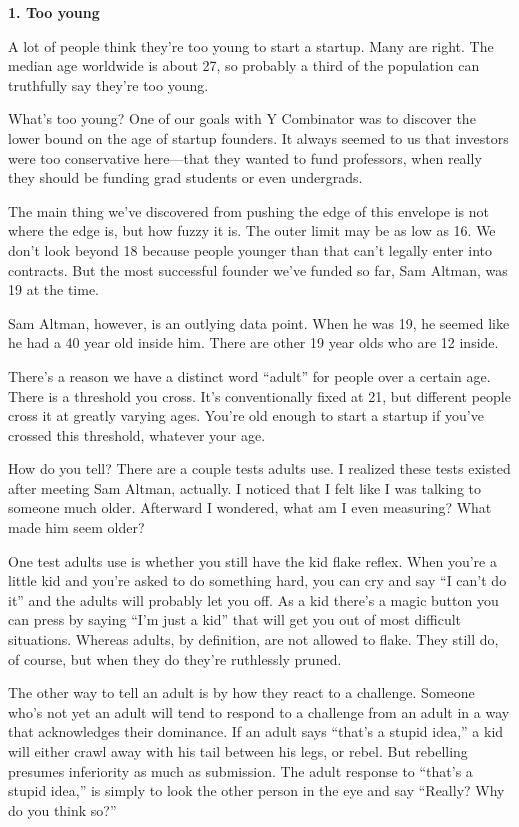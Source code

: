 \textbf{1. Too young}

A lot of people think they're too young to start a startup. Many are
right. The median age worldwide is about 27, so probably a third of the
population can truthfully say they're too young.

What's too young? One of our goals with Y Combinator was to discover the
lower bound on the age of startup founders. It always seemed to us that
investors were too conservative here---that they wanted to fund
professors, when really they should be funding grad students or even
undergrads.

The main thing we've discovered from pushing the edge of this envelope
is not where the edge is, but how fuzzy it is. The outer limit may be as
low as 16. We don't look beyond 18 because people younger than that
can't legally enter into contracts. But the most successful founder
we've funded so far, Sam Altman, was 19 at the time.

Sam Altman, however, is an outlying data point. When he was 19, he
seemed like he had a 40 year old inside him. There are other 19 year
olds who are 12 inside.

There's a reason we have a distinct word ``adult'' for people over a
certain age. There is a threshold you cross. It's conventionally fixed
at 21, but different people cross it at greatly varying ages. You're old
enough to start a startup if you've crossed this threshold, whatever
your age.

How do you tell? There are a couple tests adults use. I realized these
tests existed after meeting Sam Altman, actually. I noticed that I felt
like I was talking to someone much older. Afterward I wondered, what am
I even measuring? What made him seem older?

One test adults use is whether you still have the kid flake reflex. When
you're a little kid and you're asked to do something hard, you can cry
and say ``I can't do it'' and the adults will probably let you off. As a
kid there's a magic button you can press by saying ``I'm just a kid''
that will get you out of most difficult situations. Whereas adults, by
definition, are not allowed to flake. They still do, of course, but when
they do they're ruthlessly pruned.

The other way to tell an adult is by how they react to a challenge.
Someone who's not yet an adult will tend to respond to a challenge from
an adult in a way that acknowledges their dominance. If an adult says
``that's a stupid idea,'' a kid will either crawl away with his tail
between his legs, or rebel. But rebelling presumes inferiority as much
as submission. The adult response to ``that's a stupid idea,'' is simply
to look the other person in the eye and say ``Really? Why do you think
so?''

